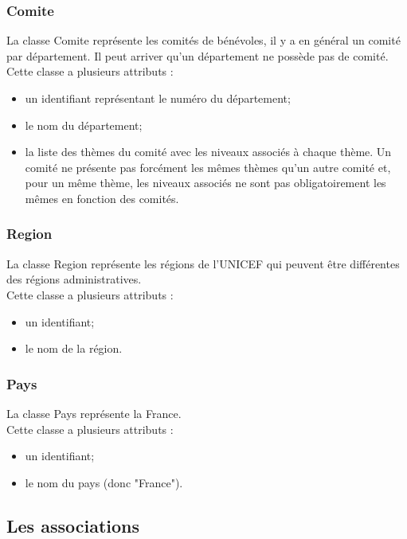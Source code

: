 \subsubsection*{Comite}

La classe Comite représente les comités de bénévoles, il y a en général un comité par département. Il peut arriver qu'un département ne possède pas de comité.\\
Cette classe a plusieurs attributs :
\begin{itemize}
\item un identifiant représentant le numéro du département;
\item le nom du département;
\item la liste des thèmes du comité avec les niveaux associés à chaque thème. Un comité ne présente pas forcément les mêmes thèmes qu'un autre comité et, pour un même thème, les niveaux associés ne sont pas obligatoirement les mêmes en fonction des comités. 
\end{itemize}

\subsubsection*{Region}

La classe Region représente les régions de l'UNICEF qui peuvent être différentes des régions administratives.\\
Cette classe a plusieurs attributs :
\begin{itemize}
\item un identifiant;
\item le nom de la région.
\end{itemize}

\subsubsection*{Pays}

La classe Pays représente la France.\\
Cette classe a plusieurs attributs :
\begin{itemize}
\item un identifiant;
\item le nom du pays (donc "France").
\end{itemize}


\subsection{Les associations}

